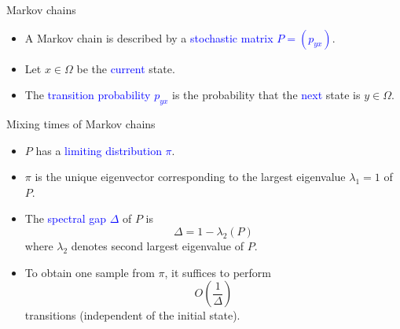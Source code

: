 \documentclass{beamer}
\renewcommand{\>}{\rangle}
\newcommand{\<}{\langle}
\begin{document}
%

\begin{frame}{Markov chains}
\begin{itemize}
    \item A Markov chain is described by a \textcolor{blue}{stochastic matrix $P=(p_{yx})$}.
    
    \medskip
    \item Let $x\in\Omega$ be the \textcolor{blue}{current} state.
    
    \medskip
    \item The \textcolor{blue}{transition probability $p_{yx}$} is the probability that the \textcolor{blue}{next} state is $y\in\Omega$.
    
\end{itemize}
\end{frame}

%

\begin{frame}{Mixing times of Markov chains}
\begin{itemize}
    \item $P$ has a \textcolor{blue}{limiting distribution $\pi$}.
    
    \medskip
    \item $\pi$ is the unique eigenvector corresponding to the largest eigenvalue $\lambda_1=1$ of $P$.

    \medskip
    \item The \textcolor{blue}{spectral gap $\Delta$} of $P$ is
    \begin{equation*}
        \Delta = 1 - \lambda_2(P)
    \end{equation*}
    where $\lambda_2$ denotes second largest eigenvalue of $P$.
    
    \medskip
    \item To obtain one sample from $\pi$, it suffices to perform
    \begin{equation*}
        O\left( \frac{1}{\Delta}\right)
    \end{equation*}
    transitions (independent of the initial state).
    
\end{itemize}

\end{frame}

%
\end{document}
